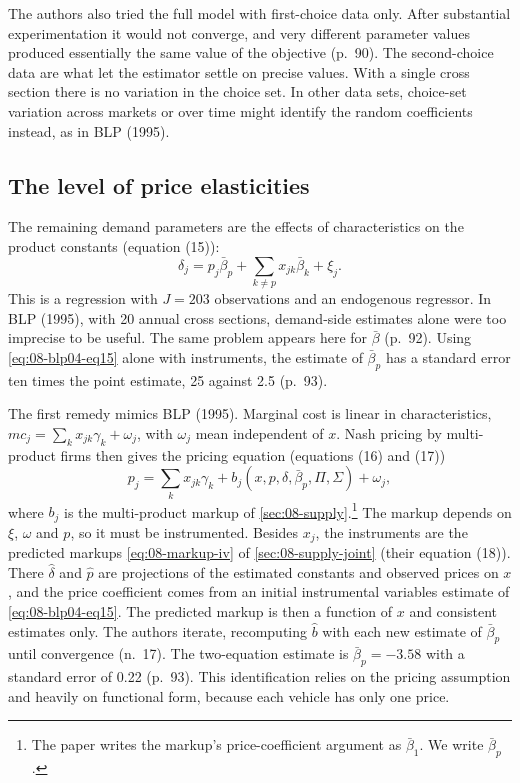  The authors also tried the full model with first-choice data only.
After substantial experimentation it would not converge, and very different parameter values produced
essentially the same value of the objective (p.~90). The second-choice data are what let the estimator settle
on precise values. With a single cross section there is no variation in the choice set. In other data sets,
choice-set variation across markets or over time might identify the random coefficients instead, as in BLP
(1995).

\subsection{The level of price elasticities}\label{sec:08-blp04-level}

The remaining demand parameters are the effects of characteristics on the product constants (equation (15)):
\begin{equation}\label{eq:08-blp04-eq15}
\delta_j = p_j\bar\beta_p + \sum_{k\neq p} x_{jk}\bar\beta_k + \xi_j .
\end{equation}
This is a regression with $J = 203$ observations and an endogenous regressor. In BLP (1995), with 20 annual
cross sections, demand-side estimates alone were too imprecise to be useful. The same problem appears here for
$\bar\beta$ (p.~92). Using \cref{eq:08-blp04-eq15} alone with instruments, the estimate of $\bar\beta_p$ has a
standard error ten times the point estimate, 25 against 2.5 (p.~93).

 The first remedy mimics BLP (1995). Marginal cost is linear in
characteristics, $mc_j = \sum_k x_{jk}\gamma_k + \omega_j$, with $\omega_j$ mean independent of $x$. Nash pricing
by multi-product firms then gives the pricing equation (equations (16) and (17))
\begin{equation}\label{eq:08-blp04-pricing}
p_j = \sum_k x_{jk}\gamma_k + b_j(x, p, \delta, \bar\beta_p, \Pi, \Sigma) + \omega_j ,
\end{equation}
where $b_j$ is the multi-product markup of \cref{sec:08-supply}.\footnote{The paper writes the markup's
price-coefficient argument as $\bar\beta_1$. We write $\bar\beta_p$.} The markup depends on $\xi$, $\omega$ and
$p$, so it must be instrumented. Besides $x_j$, the instruments are the predicted markups \eqref{eq:08-markup-iv}
of \cref{sec:08-supply-joint} (their equation (18)). There $\hat\delta$ and $\hat p$ are projections of the estimated
constants and observed prices on $x$, and the price coefficient comes from an initial instrumental variables estimate
of \eqref{eq:08-blp04-eq15}. The predicted markup is then a function of $x$ and consistent estimates only. The
authors iterate, recomputing $\hat b$ with each new estimate of $\bar\beta_p$ until convergence (n.~17). The two-equation estimate is
$\bar\beta_p = -3.58$ with a standard error of 0.22 (p.~93). This identification relies on the pricing
assumption and heavily on functional form, because each vehicle has only one price.

